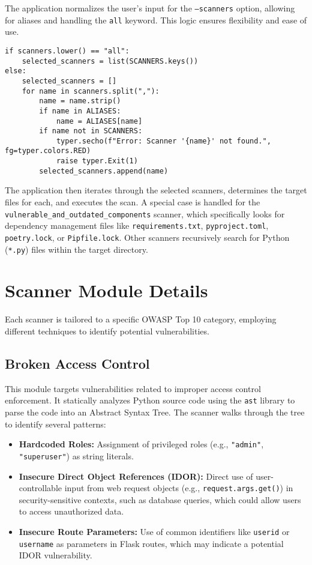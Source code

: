 The application normalizes the user's input for the \texttt{--scanners} option, allowing for aliases and handling the \texttt{all} keyword. This logic ensures flexibility and ease of use.

\begin{verbatim}
if scanners.lower() == "all":
    selected_scanners = list(SCANNERS.keys())
else:
    selected_scanners = []
    for name in scanners.split(","):
        name = name.strip()
        if name in ALIASES:
            name = ALIASES[name]
        if name not in SCANNERS:
            typer.secho(f"Error: Scanner '{name}' not found.", fg=typer.colors.RED)
            raise typer.Exit(1)
        selected_scanners.append(name)
\end{verbatim}

The application then iterates through the selected scanners, determines the target files for each, and executes the scan. A special case is handled for the \texttt{vulnerable\_and\_outdated\_components} scanner, which specifically looks for dependency management files like \texttt{requirements.txt}, \texttt{pyproject.toml}, \texttt{poetry.lock}, or \texttt{Pipfile.lock}. Other scanners recursively search for Python (\texttt{*.py}) files within the target directory.

\section{Scanner Module Details}
\label{sec:scanner_modules}

Each scanner is tailored to a specific OWASP Top 10 category, employing different techniques to identify potential vulnerabilities. 

\subsection{Broken Access Control}
This module targets vulnerabilities related to improper access control enforcement. It statically analyzes Python source code using the \texttt{ast} library to parse the code into an Abstract Syntax Tree. The scanner walks through the tree to identify several patterns:
\begin{itemize}
    \item \textbf{Hardcoded Roles:} Assignment of privileged roles (e.g., \texttt{"admin"}, \texttt{"superuser"}) as string literals.
    \item \textbf{Insecure Direct Object References (IDOR):} Direct use of user-controllable input from web request objects (e.g., \texttt{request.args.get()}) in security-sensitive contexts, such as database queries, which could allow users to access unauthorized data.
    \item \textbf{Insecure Route Parameters:} Use of common identifiers like \texttt{userid} or \texttt{username} as parameters in Flask routes, which may indicate a potential IDOR vulnerability.
\end{itemize}

